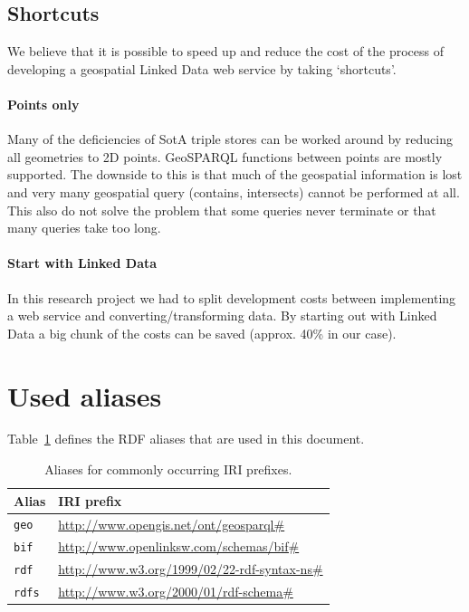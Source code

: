 \documentclass[a4paper]{scrartcl}
\newcommand{\textt}[1]{{\small \texttt{#1}}}
\begin{document}
\subsection{Shortcuts}

We believe that it is possible to speed up and reduce the cost of the
process of developing a geospatial Linked Data web service by taking
`shortcuts'.


\paragraph{Points only}

Many of the deficiencies of SotA triple stores can be worked around by
reducing all geometries to 2D points.  GeoSPARQL functions between
points are mostly supported.  The downside to this is that much of the
geospatial information is lost and very many geospatial query
(contains, intersects) cannot be performed at all.  This also do not
solve the problem that some queries never terminate or that many
queries take too long.


\paragraph{Start with Linked Data}

In this research project we had to split development costs between
implementing a web service and converting/transforming data.  By
starting out with Linked Data a big chunk of the costs can be saved
(approx. 40\% in our case).






\appendix

\section{Used aliases}

Table~\ref{tab:alias} defines the RDF aliases that are used in this
document.

\begin{table}
  \centering
  \begin{tabular}{|l|l|}
    \hline
    \textbf{Alias} & \textbf{IRI prefix}\\
    \hline
    \hline
    \textt{geo}    & \url{http://www.opengis.net/ont/geosparql#}\\
    \hline
    \textt{bif}    & \url{http://www.openlinksw.com/schemas/bif#}\\
    \hline
    \textt{rdf}    & \url{http://www.w3.org/1999/02/22-rdf-syntax-ns#}\\
    \hline
    \textt{rdfs}   & \url{http://www.w3.org/2000/01/rdf-schema#}\\
    \hline
  \end{tabular}
  \caption{Aliases for commonly occurring IRI prefixes.}
  \label{tab:alias}
\end{table}
  
\end{document}
